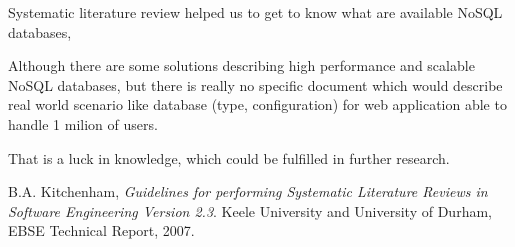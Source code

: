 \documentclass[times, 10pt,twocolumn]{article}
\newcounter{firstbib}
\begin{document}

Systematic literature review helped us to get to know what are available NoSQL databases,

Although there are some solutions describing high performance and scalable NoSQL databases, but there  
is really no specific document which would describe real world scenario like database (type, configuration) for web 
application able to handle 1 milion of users.

That is a luck in knowledge, which could be fulfilled in further research.


\renewcommand{\refname}{Article references}

\begin{thebibliography}{9}

	  B.A. Kitchenham,
	  \emph{Guidelines for performing Systematic Literature Reviews in Software Engineering Version 2.3}.
	  Keele University and University of Durham,
	  EBSE Technical Report,
	  2007.

	\setcounter{firstbib}{\value{enumiv}}

\end{thebibliography}

\renewcommand{\refname}{Systematic research review references} 
\end{document}
